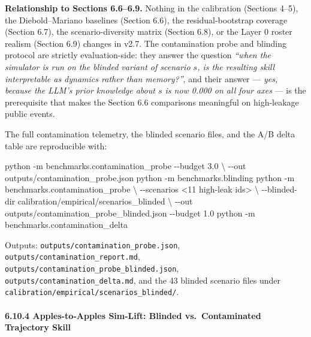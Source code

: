 \documentclass[
]{article}
\newenvironment{Shaded}{}{}
\newcommand{\AttributeTok}[1]{\textcolor[rgb]{0.49,0.56,0.16}{#1}}
\newcommand{\DataTypeTok}[1]{\textcolor[rgb]{0.56,0.13,0.00}{#1}}
\newcommand{\ExtensionTok}[1]{#1}
\newcommand{\NormalTok}[1]{#1}
\newcommand{\OperatorTok}[1]{\textcolor[rgb]{0.40,0.40,0.40}{#1}}
\begin{document}
\textbf{Relationship to Sections 6.6--6.9.} Nothing in the calibration
(Sections 4--5), the Diebold--Mariano baselines (Section 6.6), the
residual-bootstrap coverage (Section 6.7), the scenario-diversity matrix
(Section 6.8), or the Layer 0 roster realism (Section 6.9) changes in
v2.7. The contamination probe and blinding protocol are strictly
evaluation-side: they answer the question \emph{``when the simulator is
run on the blinded variant of scenario \(s\), is the resulting skill
interpretable as dynamics rather than memory?''}, and their answer ---
\emph{yes, because the LLM's prior knowledge about \(s\) is now 0.000 on
all four axes} --- is the prerequisite that makes the Section 6.6
comparisons meaningful on high-leakage public events.

The full contamination telemetry, the blinded scenario files, and the
A/B delta table are reproducible with:

\begin{Shaded}
\begin{Highlighting}[]
\ExtensionTok{python} \AttributeTok{{-}m}\NormalTok{ benchmarks.contamination\_probe }\AttributeTok{{-}{-}budget}\NormalTok{ 3.0 }\DataTypeTok{\textbackslash{}}
    \AttributeTok{{-}{-}out}\NormalTok{ outputs/contamination\_probe.json}
\ExtensionTok{python} \AttributeTok{{-}m}\NormalTok{ benchmarks.blinding}
\ExtensionTok{python} \AttributeTok{{-}m}\NormalTok{ benchmarks.contamination\_probe }\DataTypeTok{\textbackslash{}}
    \AttributeTok{{-}{-}scenarios} \OperatorTok{\textless{}}\NormalTok{11 high{-}leak ids}\OperatorTok{\textgreater{}} \DataTypeTok{\textbackslash{}}
    \AttributeTok{{-}{-}blinded{-}dir}\NormalTok{ calibration/empirical/scenarios\_blinded }\DataTypeTok{\textbackslash{}}
    \AttributeTok{{-}{-}out}\NormalTok{ outputs/contamination\_probe\_blinded.json }\AttributeTok{{-}{-}budget}\NormalTok{ 1.0}
\ExtensionTok{python} \AttributeTok{{-}m}\NormalTok{ benchmarks.contamination\_delta}
\end{Highlighting}
\end{Shaded}

Outputs: \texttt{outputs/contamination\_probe.json},
\texttt{outputs/contamination\_report.md},
\texttt{outputs/contamination\_probe\_blinded.json},
\texttt{outputs/contamination\_delta.md}, and the 43 blinded scenario
files under \texttt{calibration/empirical/scenarios\_blinded/}.

\paragraph{6.10.4 Apples-to-Apples Sim-Lift: Blinded vs.~Contaminated
Trajectory
Skill}\label{apples-to-apples-sim-lift-blinded-vs.-contaminated-trajectory-skill}
\end{document}
